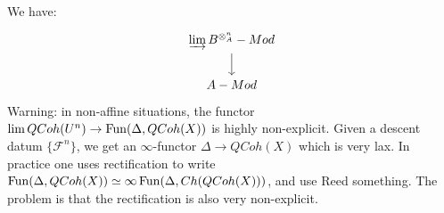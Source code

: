 \begin{rem}
We have:
\[
\begin{tikzcd}
 \varinjlim B^{\otimes_A^{n}} - Mod \arrow{d} \\
A-Mod
\end{tikzcd}
\]
Warning: in non-affine situations, the functor $\lim QCoh(U^n) \to \operatorname{Fun}(\Delta, QCoh(X))$ is highly non-explicit. Given
a descent datum $\{\mathcal{F}^n\}$, we get an $\infty$-functor $\Delta \to QCoh(X)$ which is very lax. In practice one uses
rectification to write $\operatorname{Fun}(\Delta, QCoh(X)) \simeq \infty \operatorname{Fun}(\Delta, Ch(QCoh(X)))$, and use Reed something. The problem is
that the rectification is also very non-explicit.
\end{rem}

